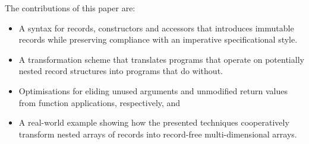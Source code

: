 The contributions of this paper are:
\begin{itemize}
    \item A syntax for records, constructors and accessors that introduces immutable records while preserving compliance with an imperative specificational style.
    \item A transformation scheme that translates programs that operate on potentially nested record structures into programs that do without.
    \item Optimisations for eliding unused arguments and unmodified return values from function applications, respectively, and
    \item A real-world example showing how the presented techniques cooperatively transform nested arrays of records into record-free multi-dimen\-sional arrays.
\end{itemize}
